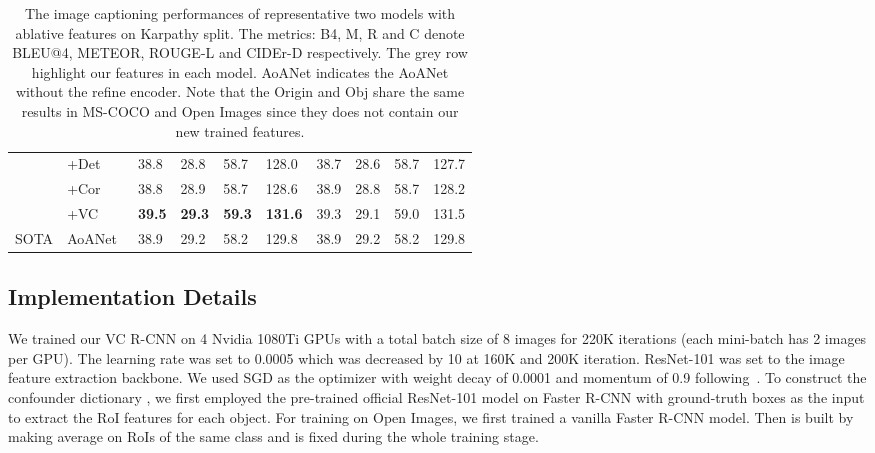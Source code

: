 \documentclass[10pt,twocolumn,letterpaper]{article}
\begin{document}
\begin{table}[t]
{\begin{tabular}{p{0.8cm}p{1.5cm}p{0.5cm}<{\centering}p{0.5cm}<{\centering}p{0.5cm}<{\centering}p{0.6cm}<{\centering}p{0.5cm}<{\centering}p{0.5cm}<{\centering}p{0.5cm}<{\centering}p{0.6cm}<{\centering}}
                     & +Det  & 38.8 & 28.8 & 58.7  & 128.0    & 38.7 & 28.6 & 58.7  & 127.7 \\
                     & +Cor & 38.8 & 28.9 & 58.7  & 128.6  & 38.9 & 28.8 & 58.7  & 128.2 \\
                    & \cellcolor{mygray}+VC    & \cellcolor{mygray}\textbf{39.5} & \cellcolor{mygray}\textbf{29.3} & \cellcolor{mygray}\textbf{59.3}  & \cellcolor{mygray}\textbf{131.6}  & \cellcolor{mygray}39.3 & \cellcolor{mygray}29.1   & \cellcolor{mygray}59.0   & \cellcolor{mygray}131.5 \\ \hline
SOTA                     & AoANet~\cite{huang2019attention}           & 38.9 & 29.2 & 58.2  & 129.8  & 38.9 & 29.2 & 58.2 & 129.8 \\ \hline \hline
\end{tabular}}
\caption{The image captioning performances of representative two models with ablative features on Karpathy split. The metrics: B4, M, R and C denote BLEU@4, METEOR, ROUGE-L and CIDEr-D respectively. The grey row highlight our features in each model. AoANet indicates the AoANet without the refine encoder. Note that the Origin and Obj share the same results in MS-COCO and Open Images since they does not contain our new trained features.}
\label{tab:caption}
\vspace{-0.3cm}
\end{table}





\subsection{Implementation Details}

We trained our VC R-CNN on 4 Nvidia 1080Ti GPUs with a total batch size of 8 images for 220K iterations (each mini-batch has 2 images per GPU). 
The learning rate was set to 0.0005 which was decreased by 10 at 160K and 200K iteration. ResNet-101 was set to the image feature extraction backbone. We used SGD as the optimizer with weight decay of 0.0001 and momentum of 0.9 following~\cite{ren2015faster}. To construct the confounder dictionary , we first employed the pre-trained official ResNet-101 model on Faster R-CNN with ground-truth boxes as the input to extract the RoI features for each object. For training on Open Images, we first trained a vanilla Faster R-CNN model.
Then  is built by making average on RoIs of the same class and is fixed during the whole training stage.
\end{document}
